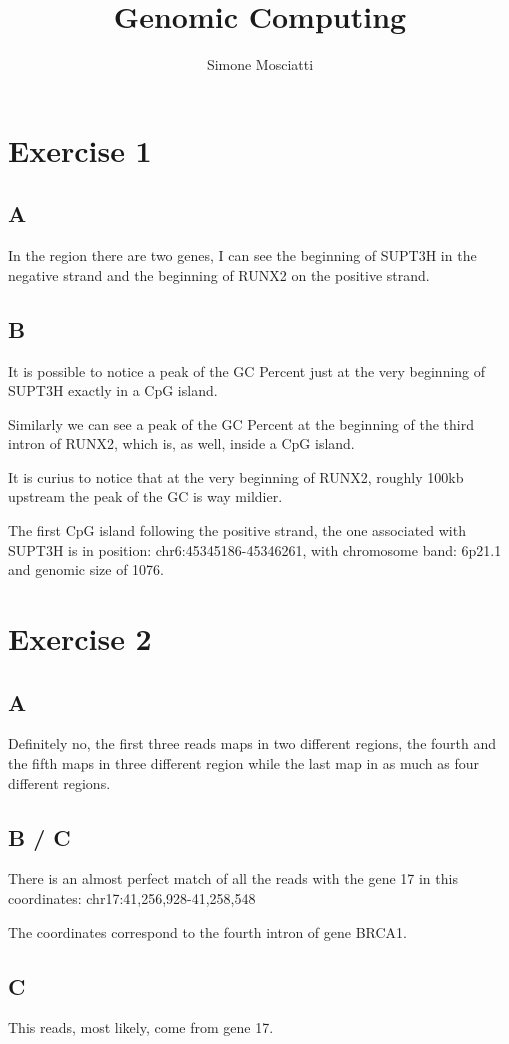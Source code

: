 \documentclass[11pt]{article} %
\title{Genomic Computing}
\author{Simone Mosciatti}
\begin{document}
\maketitle

\section{Exercise 1}

\subsection{A}

In the region there are two genes, I can see the beginning of SUPT3H in the negative strand and the beginning of RUNX2 on the positive strand.

\subsection{B}

It is possible to notice a peak of the GC Percent just at the very beginning of SUPT3H exactly in a CpG island.

Similarly we can see a peak of the GC Percent at the beginning of the third intron of RUNX2, which is, as well, inside a CpG island.

It is curius to notice that at the very beginning of RUNX2, roughly 100kb upstream the peak of the GC is way mildier.

The first CpG island following the positive strand, the one associated with SUPT3H is in position: chr6:45345186-45346261, with chromosome band: 6p21.1 and genomic size of 1076.

\section{Exercise 2}

\subsection{A}

Definitely no, the first three reads maps in two different regions, the fourth and the fifth maps in three different region while the last map in as much as four different regions.

\subsection{B / C}

There is an almost perfect match of all the reads with the gene 17 in this coordinates: chr17:41,256,928-41,258,548

The coordinates correspond to the fourth intron of gene BRCA1.

\subsection{C}

This reads, most likely, come from gene 17.
\end{document}
